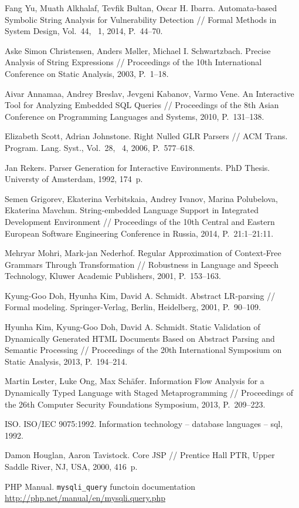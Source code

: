 \documentclass{llncs}
\begin{document}
%
%
\begin{thebibliography}{}
%
Fang Yu, Muath Alkhalaf, Tevfik Bultan, Oscar H. Ibarra.
Automata-based Symbolic String Analysis for Vulnerability Detection //
Formal Methods in System Design, Vol.~44, \textnumero~1, 2014, P.~44--70.

Aske Simon Christensen, Anders M{\o}ller, Michael I. Schwartzbach.
Precise Analysis of String Expressions //
Proceedings of the 10th International Conference on Static Analysis, 2003, P.~1--18.

Aivar Annamaa, Andrey Breslav, Jevgeni Kabanov, Varmo Vene.
An Interactive Tool for Analyzing Embedded SQL Queries //
Proceedings of the 8th Asian Conference on Programming Languages and Systems, 2010, P.~131--138.

Elizabeth Scott, Adrian Johnstone.
Right Nulled GLR Parsers // ACM Trans. Program. Lang. Syst., Vol.~28, \textnumero~4,
2006, P.~577--618.

Jan Rekers.
Parser Generation for Interactive Environments. PhD Thesis. Universty of Amsterdam, 1992, 174~p.


Semen Grigorev, Ekaterina Verbitskaia, Andrey Ivanov, Marina Polubelova, Ekaterina Mavchun.
String-embedded Language Support in Integrated Development Environment //
Proceedings of the 10th Central and Eastern European Software Engineering Conference in Russia, 2014, P.~21:1--21:11.

Mehryar Mohri, Mark-jan Nederhof.
Regular Approximation of Context-Free Grammars Through Transformation //
Robustness in Language and Speech Technology, Kluwer Academic Publishers, 2001, P.~153--163. 

Kyung-Goo Doh, Hyunha Kim, David A. Schmidt.
Abstract LR-parsing //
Formal modeling. Springer-Verlag, Berlin, Heidelberg, 2001, P.~90--109.

Hyunha Kim, Kyung-Goo Doh, David A. Schmidt.
Static Validation of Dynamically Generated HTML Documents Based on Abstract Parsing and Semantic Processing //
Proceedings of the 20th International Symposium on Static Analysis, 2013, P.~194--214.

Martin Lester, Luke Ong, Max Sch{\"{a}}fer.
Information Flow Analysis for a Dynamically Typed Language with Staged Metaprogramming //
Proceedings of the 26th Computer Security Foundations Symposium, 2013, P.~209--223.

ISO. ISO/IEC 9075:1992. Information technology -- database languages -- sql, 1992.

Damon Houglan, Aaron Tavistock. Core JSP // Prentice Hall PTR, Upper Saddle River, NJ, USA, 2000, 416~p.

PHP Manual. \verb|mysqli_query| functoin documentation \url{http://php.net/manual/en/mysqli.query.php}

\end{thebibliography}
\end{document}
